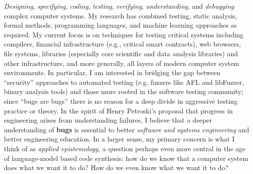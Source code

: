 \documentclass[ComputerScience]{vita}
\begin{document}
\begin{vita}
\begin{Research Interests}
\item \emph{Designing}, \emph{specifying}, \emph{coding},
  \emph{testing}, \emph{verifying}, \emph{understanding}, and
  \emph{debugging} complex computer systems.   My research has combined testing, static analysis, formal methods, programming
  languages, and machine learning approaches as required.  My current
  focus is on techniques for testing critical systems including
  compilers, financial infrastructure (e.g., critical smart
  contracts), web browsers, file systems, libraries (especially core
  scientific and data analysis libraries) and other
  infrastructure, 
  and more generally, all layers of modern computer system
  environments.  In particular, I am interested in bridging the gap
  between ``security'' approaches to automated testing (e.g. fuzzers
  like AFL and libFuzzer, binary analysis tools) and those more rooted in the software
  testing community; since ``bugs are bugs'' there is no reason for a
  deep divide in aggressive testing practice or theory.
  In the spirit of Henry Petroski's proposal that progress in
  engineering arises from understanding failures, I believe that a
  deeper understanding of {\bf bugs} is essential to better
  \emph{software and systems engineering} and better engineering
  education.  In a larger sense, my primary concern is what I think of
  as \emph{applied epistemology}, a question perhaps even more central
  in the age of language-model based code synthesis: how do we know
  that a computer system does what we want it to do?  How do we even know
  what we want it to do?
\end{Research Interests}



\end{vita}
\end{document}
